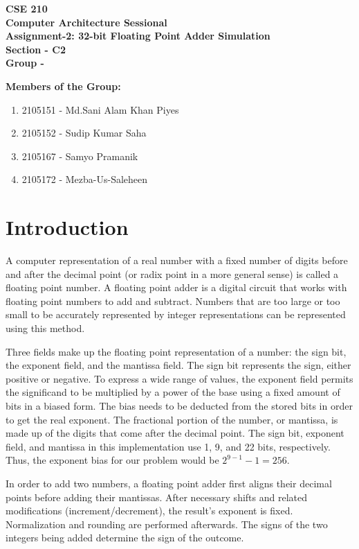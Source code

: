 \documentclass[a4paper,12pt]{article}
\begin{document}
\begin{center}
    \textbf{CSE 210} \\
    \textbf{Computer Architecture Sessional} \\[.8cm]
    \textbf{Assignment-2: 32-bit Floating Point Adder Simulation} \\[1cm]
    \textbf{Section - C2} \\
    \textbf{Group - } \\[5cm]
\end{center}

\noindent\textbf{Members of the Group:}
\begin{enumerate}
    \item 2105151 - Md.Sani Alam Khan Piyes
    \item 2105152 - Sudip Kumar Saha
    \item 2105167 - Samyo Pramanik
    \item 2105172 - Mezba-Us-Saleheen
\end{enumerate}
\newpage



\section{Introduction}

A computer representation of a real number with a fixed number of digits before and after the decimal point (or radix point in a more general sense) is called a floating point number. A floating point adder is a digital circuit that works with floating point numbers to add and subtract. Numbers that are too large or too small to be accurately represented by integer representations can be represented using this method.

Three fields make up the floating point representation of a number: the sign bit, the exponent field, and the mantissa field. The sign bit represents the sign, either positive or negative. To express a wide range of values, the exponent field permits the significand to be multiplied by a power of the base using a fixed amount of bits in a biased form. The bias needs to be deducted from the stored bits in order to get the real exponent. The fractional portion of the number, or mantissa, is made up of the digits that come after the decimal point. The sign bit, exponent field, and mantissa in this implementation use 1, 9, and 22 bits, respectively. Thus, the exponent bias for our problem would be $2^{9 - 1} - 1 = 256$.

In order to add two numbers, a floating point adder first aligns their decimal points before adding their mantissas. After necessary shifts and related modifications (increment/decrement), the result’s exponent is fixed. Normalization and rounding are performed afterwards. The signs of the two integers being added determine the sign of the outcome.
\end{document}
